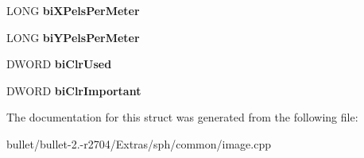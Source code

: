 \begin{DoxyCompactItemize}
\item 
\hypertarget{structtag_b_i_t_m_a_p_i_n_f_o_h_e_a_d_e_r_ae363738b6e92248a7be41f4e7ed55c54}{L\+O\+N\+G {\bfseries bi\+X\+Pels\+Per\+Meter}}\label{structtag_b_i_t_m_a_p_i_n_f_o_h_e_a_d_e_r_ae363738b6e92248a7be41f4e7ed55c54}

\item 
\hypertarget{structtag_b_i_t_m_a_p_i_n_f_o_h_e_a_d_e_r_ac6226594275d045ff0d03849945d920f}{L\+O\+N\+G {\bfseries bi\+Y\+Pels\+Per\+Meter}}\label{structtag_b_i_t_m_a_p_i_n_f_o_h_e_a_d_e_r_ac6226594275d045ff0d03849945d920f}

\item 
\hypertarget{structtag_b_i_t_m_a_p_i_n_f_o_h_e_a_d_e_r_adbf6bd52839895672030a734d2ae752f}{D\+W\+O\+R\+D {\bfseries bi\+Clr\+Used}}\label{structtag_b_i_t_m_a_p_i_n_f_o_h_e_a_d_e_r_adbf6bd52839895672030a734d2ae752f}

\item 
\hypertarget{structtag_b_i_t_m_a_p_i_n_f_o_h_e_a_d_e_r_a637282b108fc8ac3bdf41479f9931ccb}{D\+W\+O\+R\+D {\bfseries bi\+Clr\+Important}}\label{structtag_b_i_t_m_a_p_i_n_f_o_h_e_a_d_e_r_a637282b108fc8ac3bdf41479f9931ccb}

\end{DoxyCompactItemize}


The documentation for this struct was generated from the following file\+:\begin{DoxyCompactItemize}
\item 
bullet/bullet-\/2.-\/r2704/\+Extras/sph/common/image.\+cpp\end{DoxyCompactItemize}
